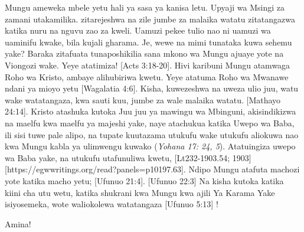 Mungu ameweka mbele yetu hali ya sasa ya kanisa letu. Upyaji wa Msingi za zamani utakamilika.  zitarejeshwa na zile jumbe za malaika watatu zitatangazwa katika nuru na nguvu zao za kweli. Uamuzi pekee tulio nao ni uamuzi wa uaminifu kwake, bila kujali gharama. Je, wewe na mimi tunataka kuwa sehemu yake? Baraka zitafuata tunaposhikilia sana mkono wa Mungu ajuaye yote na Viongozi wake.  Yeye atatimiza! [Acts 3:18-20]. Hivi karibuni Mungu atamwaga Roho wa Kristo, ambaye alihubiriwa kwetu. Yeye atatuma Roho wa Mwanawe ndani ya mioyo yetu [Wagalatia 4:6]. Kisha, kuwezeshwa na uweza ulio juu, watu wake watatangaza, kwa sauti kuu, jumbe za wale malaika watatu. [Mathayo 24:14]. Kristo atashuka kutoka Juu juu ya mawingu wa Mbinguni, akisindikizwa na maelfu kwa maelfu ya majeshi yake, naye atachukua katika Uwepo wa Baba, ili sisi tuwe pale alipo, na tupate kuutazama utukufu wake utukufu aliokuwa nao kwa Mungu kabla ya ulimwengu kuwako (\textit{Yohana 17: 24, 5}). Atatuingiza uwepo wa Baba yake, na utukufu utafunuliwa kwetu, [Lt232-1903.54; 1903][https://egwwritings.org/read?panels=p10197.63]. Ndipo Mungu atafuta machozi yote katika macho yetu; [Ufunuo 21:4]. [Ufunuo 22:3] Na kisha kutoka katika kiini cha utu wetu, katika shukrani kwa Mungu kwa ajili Ya Karama Yake isiyosemeka, wote waliokolewa  watatangaza [Ufunuo 5:13]
!


Amina!




